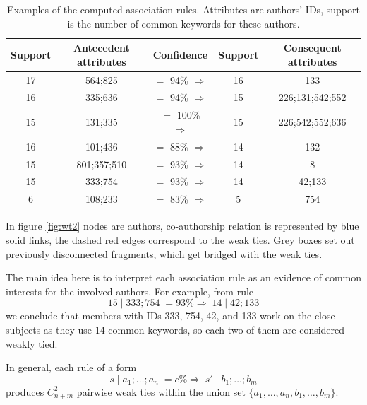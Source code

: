 \documentclass[12pt]{report}
\theoremstyle{definition}
\begin{document}
\begin{table}[H]
	\caption{Examples of the computed association rules. Attributes are authors' IDs, support is the number of common keywords for these authors.}
	\label{tab:wt1}
	\begin{center}
		\renewcommand{\arraystretch}{1.5}
		\label{my-label}
		\begin{tabular}{|c|c|c|c|c|}
			\hline
			Support & Antecedent attributes & Confidence & Support & Consequent attributes \\\hline\hline
			17 & 564;825 & $=$ 94\% $\Rightarrow$ & 16 & 133 \\
			16 & 335;636 & $=$ 94\% $\Rightarrow$ & 15 & 226;131;542;552    \\
			15 & 131;335 & $=$ 100\% $\Rightarrow$ & 15 & 226;542;552;636   \\
			16 & 101;436 & $=$ 88\% $\Rightarrow$ & 14 & 132   \\
			15 & 801;357;510 & $=$ 93\% $\Rightarrow$ & 14 & 8   \\
			15 & 333;754 & $=$ 93\% $\Rightarrow$ & 14 & 42;133\\  
			6 & 108;233 & $=$ 83\% $\Rightarrow$ & 5 & 754\\  
			\hline
		\end{tabular}
	\end{center}
\end{table}

In figure \ref{fig:wt2} nodes are authors, co-authorship relation is represented by blue solid links, the dashed red edges correspond to the weak ties. Grey boxes set out previously disconnected fragments, which get bridged with the weak ties.


The main idea here is to interpret each association rule as an evidence of common interests for the involved authors. For example, from rule
$$
15 \; | \; 333;754 \; = 93\% \Rightarrow \;  14\; | \; 42;133  
$$
we conclude that members with IDs 333, 754, 42, and 133 work on the close subjects as they use 14 common keywords, so each two of them are considered weakly tied.

In general, each rule of a form
$$
s \; | \; a_1;\ldots;a_n \; = c\% \Rightarrow \;  s'\; | \; b_1;\ldots;b_m  
$$
produces $C_{n+m}^2$  pairwise weak ties within the union set $\{a_1,\ldots,a_n, b_1,\ldots,b_m\}$.
\end{document}
